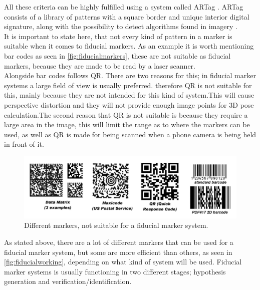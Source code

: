				All these criteria can be highly fulfilled using a system called ARTag \cite{fiducialARTag}. ARTag consists of a library of patterns with a square border and unique interior digital signature, along with the possibility to detect algorithms found in imagery \cite{fiducialMarkers}.\\
				
				It is important to state here, that not every kind of pattern in a marker is suitable when it comes to fiducial markers\cite{fiducialMarkers}. As an example it is worth mentioning bar codes as seen in \autoref{fig:fiducialmarkers}, these are not suitable as fiducial markers, because they are made to be read by a laser scanner.\\
				Alongside bar codes follows QR. There are two reasons for this; in fiducial marker systems a large field of view is usually preferred. therefore QR is not suitable for this, mainly because they are not intended for this kind of system.This will cause perspective distortion and they will not provide enough image points for 3D pose calculation.The second reason that QR is not suitable is because they require a large area in the image, this will limit the range as to where the markers can be used, as well as QR is made for being scanned when a phone camera is being held in front of it.\\ 
				
				
					\begin{figure}[H]
						\centering
						\includegraphics[width=0.9\linewidth]{figure/Analysis/fiducialmarkers.png}
						\caption{Different markers, not suitable for a fiducial marker system.}
						\label{fig:fiducialmarkers}
					\end{figure}
					
				
				As stated above, there are a lot of different markers that can be used for a fiducial marker system, but some are more efficient than others, as seen in \autoref{fig:fiducialworking}, depending on what kind of system will be used.
				Fiducial marker systems is usually functioning in two different stages; hypothesis generation and verification/identification.\\
				
